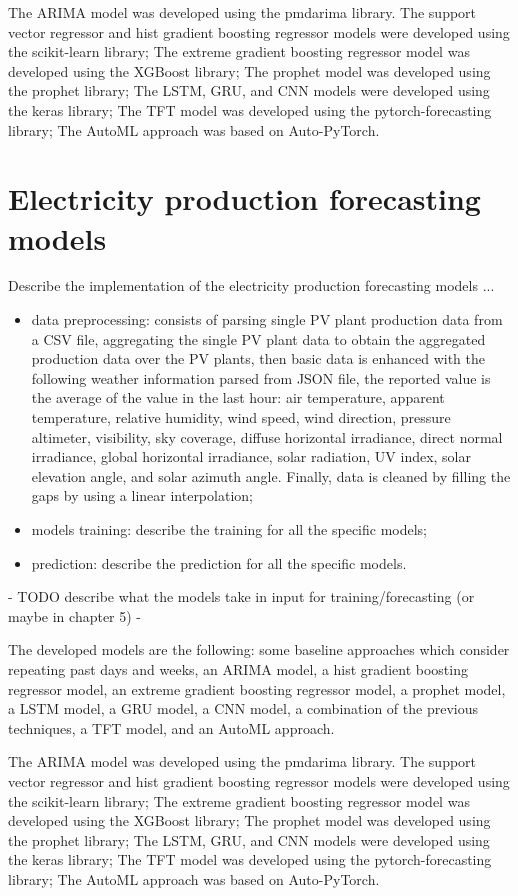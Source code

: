 The ARIMA model was developed using the pmdarima library.
The support vector regressor and hist gradient boosting regressor models were developed using the scikit-learn library;
The extreme gradient boosting regressor model was developed using the XGBoost library;
The prophet model was developed using the prophet library;
The LSTM, GRU, and CNN models were developed using the keras library;
The TFT model was developed using the pytorch-forecasting library;
The AutoML approach was based on Auto-PyTorch.


\section{Electricity production forecasting models}
\label{sec:productionimpl}
\vspace{0.2 cm}

Describe the implementation of the electricity production forecasting models ...
\begin{itemize}
  \item data preprocessing: consists of parsing single PV plant production data from a CSV file, aggregating the single PV plant data to obtain the aggregated production data over the PV plants, then basic data is enhanced with the following weather information parsed from JSON file, the reported value is the average of the value in the last hour: air temperature, apparent temperature, relative humidity, wind speed, wind direction, pressure altimeter, visibility, sky coverage, diffuse horizontal irradiance, direct normal irradiance, global horizontal irradiance, solar radiation, UV index, solar elevation angle, and solar azimuth angle. Finally, data is cleaned by filling the gaps by using a linear interpolation;
  \item models training: describe the training for all the specific models;
  \item prediction: describe the prediction for all the specific models.
\end{itemize}


 - TODO describe what the models take in input for training/forecasting (or maybe in chapter 5) -


The developed models are the following: some baseline approaches which consider repeating past days and weeks, an ARIMA model, a hist gradient boosting regressor model, an extreme gradient boosting regressor model, a prophet model, a LSTM model, a GRU model, a CNN model, a combination of the previous techniques, a TFT model, and an AutoML approach.

The ARIMA model was developed using the pmdarima library.
The support vector regressor and hist gradient boosting regressor models were developed using the scikit-learn library;
The extreme gradient boosting regressor model was developed using the XGBoost library;
The prophet model was developed using the prophet library;
The LSTM, GRU, and CNN models were developed using the keras library;
The TFT model was developed using the pytorch-forecasting library;
The AutoML approach was based on Auto-PyTorch.

